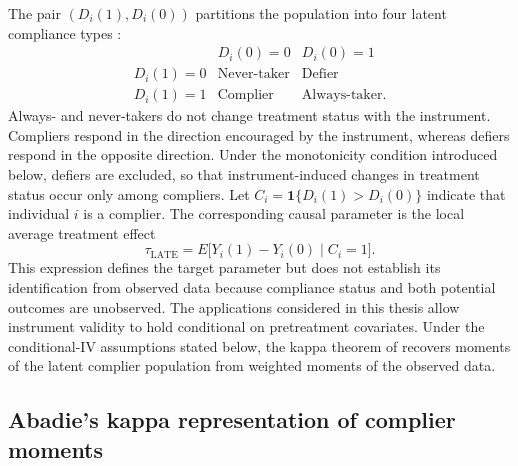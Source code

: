 \documentclass[12pt, a4paper, oneside]{article}
\theoremstyle{plain}
\theoremstyle{definition}
\begin{document}
The pair $(D_i(1),D_i(0))$ partitions the population into four latent
compliance types \citep{angrist1996identification}:
\[
\begin{array}{c|cc}
 & D_i(0)=0 & D_i(0)=1 \\
\hline
D_i(1)=0 & \text{Never-taker} & \text{Defier} \\
D_i(1)=1 & \text{Complier} & \text{Always-taker}.
\end{array}
\]
Always- and never-takers do not change treatment status with the instrument. Compliers respond in the direction encouraged by the instrument, whereas defiers respond in the opposite direction. Under the monotonicity condition introduced below, defiers are excluded, so that instrument-induced changes in treatment status occur only among compliers. Let $C_i=\mathbf{1}\{D_i(1)>D_i(0)\}$ indicate that individual $i$ is a complier. The corresponding causal parameter is the local average treatment effect \citep{angrist1995identification}
\begin{equation}
    \tau_{\mathrm{LATE}}
    =E\bigl[Y_i(1)-Y_i(0)\mid C_i=1\bigr].
    \label{eq:late_definition}
\end{equation}
This expression defines the target parameter but does not establish its identification from observed data because compliance status and both potential outcomes are unobserved. The applications considered in this thesis allow instrument validity to hold conditional on pretreatment covariates. Under the conditional-IV assumptions stated below, the kappa theorem of \citet{abadie2003semiparametric} recovers moments of the latent complier population from weighted moments of the observed data.



\subsection{Abadie's kappa representation of complier moments}
\end{document}
